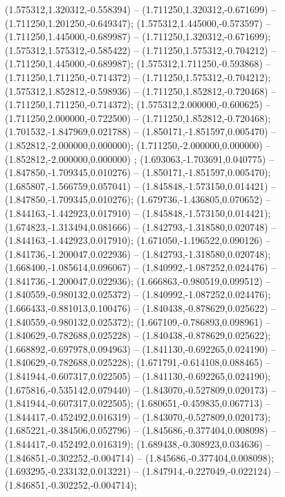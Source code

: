  (1.575312,1.320312,-0.558394) -- (1.711250,1.320312,-0.671699) -- (1.711250,1.201250,-0.649347);
 (1.575312,1.445000,-0.573597) -- (1.711250,1.445000,-0.689987) -- (1.711250,1.320312,-0.671699);
 (1.575312,1.575312,-0.585422) -- (1.711250,1.575312,-0.704212) -- (1.711250,1.445000,-0.689987);
 (1.575312,1.711250,-0.593868) -- (1.711250,1.711250,-0.714372) -- (1.711250,1.575312,-0.704212);
 (1.575312,1.852812,-0.598936) -- (1.711250,1.852812,-0.720468) -- (1.711250,1.711250,-0.714372);
 (1.575312,2.000000,-0.600625) -- (1.711250,2.000000,-0.722500) -- (1.711250,1.852812,-0.720468);
 (1.701532,-1.847969,0.021788) -- (1.850171,-1.851597,0.005470) -- (1.852812,-2.000000,0.000000);
 (1.711250,-2.000000,0.000000) -- (1.852812,-2.000000,0.000000) ;
 (1.693063,-1.703691,0.040775) -- (1.847850,-1.709345,0.010276) -- (1.850171,-1.851597,0.005470);
 (1.685807,-1.566759,0.057041) -- (1.845848,-1.573150,0.014421) -- (1.847850,-1.709345,0.010276);
 (1.679736,-1.436805,0.070652) -- (1.844163,-1.442923,0.017910) -- (1.845848,-1.573150,0.014421);
 (1.674823,-1.313494,0.081666) -- (1.842793,-1.318580,0.020748) -- (1.844163,-1.442923,0.017910);
 (1.671050,-1.196522,0.090126) -- (1.841736,-1.200047,0.022936) -- (1.842793,-1.318580,0.020748);
 (1.668400,-1.085614,0.096067) -- (1.840992,-1.087252,0.024476) -- (1.841736,-1.200047,0.022936);
 (1.666863,-0.980519,0.099512) -- (1.840559,-0.980132,0.025372) -- (1.840992,-1.087252,0.024476);
 (1.666433,-0.881013,0.100476) -- (1.840438,-0.878629,0.025622) -- (1.840559,-0.980132,0.025372);
 (1.667109,-0.786893,0.098961) -- (1.840629,-0.782688,0.025228) -- (1.840438,-0.878629,0.025622);
 (1.668892,-0.697978,0.094963) -- (1.841130,-0.692265,0.024190) -- (1.840629,-0.782688,0.025228);
 (1.671791,-0.614108,0.088465) -- (1.841944,-0.607317,0.022505) -- (1.841130,-0.692265,0.024190);
 (1.675816,-0.535142,0.079440) -- (1.843070,-0.527809,0.020173) -- (1.841944,-0.607317,0.022505);
 (1.680651,-0.459835,0.067713) -- (1.844417,-0.452492,0.016319) -- (1.843070,-0.527809,0.020173);
 (1.685221,-0.384506,0.052796) -- (1.845686,-0.377404,0.008098) -- (1.844417,-0.452492,0.016319);
 (1.689438,-0.308923,0.034636) -- (1.846851,-0.302252,-0.004714) -- (1.845686,-0.377404,0.008098);
 (1.693295,-0.233132,0.013221) -- (1.847914,-0.227049,-0.022124) -- (1.846851,-0.302252,-0.004714);
